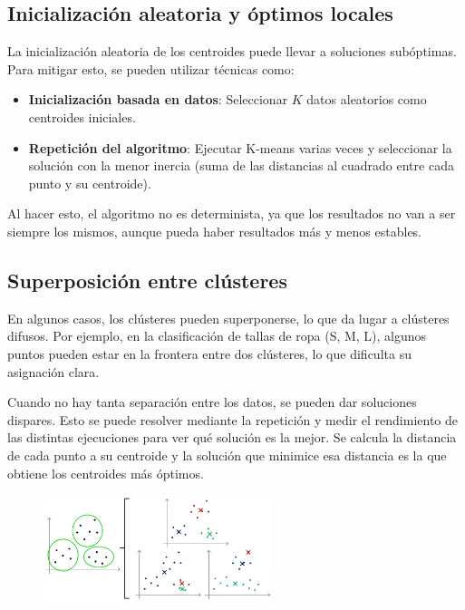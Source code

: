 \subsection{Inicialización aleatoria y óptimos locales}
La inicialización aleatoria de los centroides puede llevar a soluciones subóptimas. Para mitigar esto, se pueden utilizar técnicas como:
\begin{itemize}
\item \textbf{Inicialización basada en datos}: Seleccionar $K$ datos aleatorios como centroides iniciales.
\item \textbf{Repetición del algoritmo}: Ejecutar K-means varias veces y seleccionar la solución con la menor inercia (suma de las distancias al cuadrado entre cada punto y su centroide).
\end{itemize}

Al hacer esto, el algoritmo no es determinista, ya que los resultados no van a ser siempre los mismos, aunque pueda haber resultados más y menos estables. 

\subsection{Superposición entre clústeres}
En algunos casos, los clústeres pueden superponerse, lo que da lugar a clústeres difusos. Por ejemplo, en la clasificación de tallas de ropa (S, M, L), algunos puntos pueden estar en la frontera entre dos clústeres, lo que dificulta su asignación clara.

Cuando no hay tanta separación entre los datos, se pueden dar soluciones dispares. Esto se puede resolver mediante la repetición y medir el rendimiento de las distintas ejecuciones para ver qué solución es la mejor. Se calcula la distancia de cada punto a su centroide y la solución que minimice esa distancia es la que obtiene los centroides más óptimos. 

\begin{figure}[h]
\centering
\includegraphics[width = 0.6\textwidth]{figs/kmeans-centroids.png}
\end{figure}

